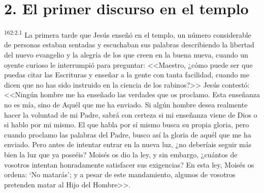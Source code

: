 \section*{2. El primer discurso en el templo}
\par 
\textsuperscript{162:2.1} La primera tarde que Jesús enseñó en el templo, un número considerable de personas estaban sentadas y escuchaban sus palabras describiendo la libertad del nuevo evangelio y la alegría de los que creen en la buena nueva, cuando un oyente curioso le interrumpió para preguntar: <<Maestro, ¿cómo puede ser que puedas citar las Escrituras y enseñar a la gente con tanta facilidad, cuando me dicen que no has sido instruido en la ciencia de los rabinos?>> Jesús contestó: <<Ningún hombre me ha enseñado las verdades que os proclamo. Esta enseñanza no es mía, sino de Aquél que me ha enviado. Si algún hombre desea realmente hacer la voluntad de mi Padre, sabrá con certeza si mi enseñanza viene de Dios o si hablo por mi mismo. El que habla por sí mismo busca su propia gloria, pero cuando proclamo las palabras del Padre, busco así la gloria de aquél que me ha enviado. Pero antes de intentar entrar en la nueva luz, ¿no deberíais seguir más bien la luz que ya poseéis? Moisés os dio la ley, y sin embargo, ¿cuántos de vosotros intentan honradamente satisfacer sus exigencias? En esta ley, Moisés os ordena:
`No matarás'; y a pesar de este mandamiento, algunos de vosotros pretenden matar al Hijo del Hombre>>.


